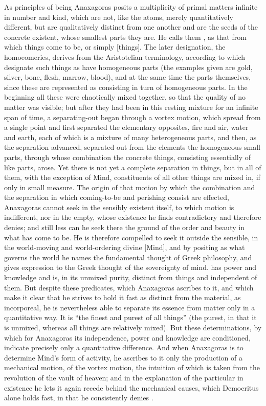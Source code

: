 As principles of being Anaxagoras posits a multiplicity of primal
matters infinite in number and kind, which are not, like the atoms,
merely quantitatively different, but are qualitatively distinct from
one another and are the seeds of the concrete existent, whose smallest
parts they are. He calls them , as that from which things
come to be, or simply  [things]. The later designation,
the homoeomeries, derives from the Aristotelian terminology, according
to which  designate such things as have homogeneous
parts (the examples given are gold, silver, bone, flesh, marrow,
blood), and at the same time the parts themselves, since these are
represented as consisting in turn of homogeneous parts. In the
beginning all these  were chaotically mixed together, so
that the quality of no matter was visible; but after they had been in
this resting mixture for an infinite span of time, a separating-out
began through a vortex motion, which spread from a single point and
first separated the elementary opposites, fire and air, water and
earth, each of which is a mixture of many heterogeneous parts, and
then, as the separation advanced, separated out from the elements the
homogeneous small parts, through whose combination the concrete things,
consisting essentially of like parts, arose. Yet there is not yet a
complete separation in things, but in all of them, with the exception
of Mind, constituents of all other things are mixed in, if only in
small measure. The origin of that motion by which the combination and
the separation in which coming-to-be and perishing consist
are effected, Anaxagoras cannot seek in the sensibly existent itself,
to which motion is indifferent, nor in the empty, whose existence he
finds contradictory and therefore denies; and still less can he seek
there the ground of the order and beauty in what has come to be. He is
therefore compelled to seek it outside the sensible, in the
world-moving and world-ordering divine  [Mind], and by
positing  as what governs the world he names the fundamental
thought of Greek philosophy, and gives expression to the Greek thought
of the sovereignty of mind.  has power and knowledge and is,
in its unmixed purity, distinct from things and independent of them.
But despite these predicates, which Anaxagoras ascribes to it, and
which make it clear that he strives to hold it fast as distinct from
the material, as incorporeal, he is nevertheless able to separate its
essence from matter only in a quantitative way. It is ``the finest and
purest of all things'' (the purest, in that it is unmixed, whereas all
things are relatively mixed). But these determinations, by which for
Anaxagoras its independence, power and knowledge are conditioned,
indicate precisely only a quantitative difference. And when Anaxagoras
is to determine Mind's form of activity, he ascribes to it only the
production of a mechanical motion, of the vortex motion, the intuition
of which is taken from the revolution of the vault of heaven; and in
the explanation of the particular in existence he lets it again recede
behind the mechanical causes, which Democritus alone holds fast, in
that he consistently denies .

